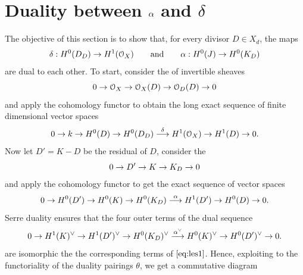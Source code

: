 \section{Duality between $\alpha$ and $\delta$}\label{sec:alpha_delta}

	The objective of this section is to show that, for every divisor $D\in X_d$, the maps
	$$ \delta:H^0(D_D)\to H^1(\mathcal{O}_X) \qquad \text{and} \qquad \alpha:H^0(J)\to H^0(K_D) $$
	are dual to each other.
	To start, consider the \ses of invertible sheaves 
	$$ 0 \to \mathcal{O}_X \to \mathcal{O}_X(D) \to \mathcal{O}_D(D) \to 0 $$
	and apply the cohomology functor to obtain the long exact sequence of finite dimensional vector spaces
	\begin{equation}\label{eq:les1}
		0\to k \to H^0(D) \to H^0(D_D) \overset{\delta}\longrightarrow H^1(\mathcal{O}_X) \to H^1(D) \to 0.
	\end{equation}
	Now let $D'=K-D$ be the residual of $D$, consider the \ses
	$$ 0 \to D' \to K \to K_D \to 0 $$
	and apply the cohomology functor to get the exact sequence of vector spaces
	$$ 0\to H^0(D') \to H^0(K) \to H^0(K_D) \overset{\alpha}\longrightarrow H^1(D') \to H^0(D) \to 0. $$
	Serre duality ensures that the four outer terms of the dual sequence
	$$ 0\to H^1(K)^{\vee} \to H^1(D')^{\vee} \to H^0(K_D)^{\vee} \overset{\alpha^{\vee}}\longrightarrow H^0(K)^{\vee} \to H^0(D')^{\vee} \to 0. $$
	are isomorphic the the corresponding terms of $\ref{eq:les1}$. Hence, exploiting to the functoriality of the duality pairings $\theta$, we get a commutative diagram
